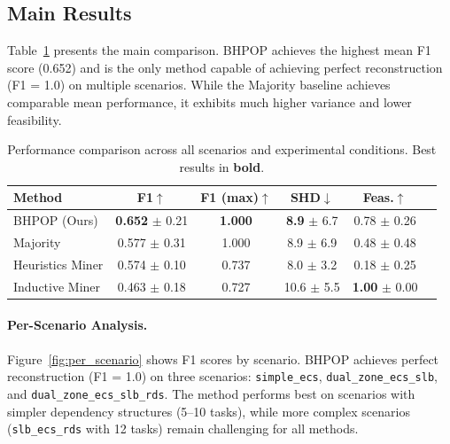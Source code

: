 \subsection{Main Results}

Table~\ref{tab:main_results} presents the main comparison. \textsc{BHPOP} achieves the highest mean F1 score (0.652) and is the only method capable of achieving perfect reconstruction (F1 = 1.0) on multiple scenarios. While the Majority baseline achieves comparable mean performance, it exhibits much higher variance and lower feasibility.

\begin{table}[t]
\caption{Performance comparison across all scenarios and experimental conditions. Best results in \textbf{bold}.}
\label{tab:main_results}
\centering
\small
\begin{tabular}{lccccc}
\toprule
\textbf{Method} & \textbf{F1}$\uparrow$ & \textbf{F1 (max)}$\uparrow$ & \textbf{SHD}$\downarrow$ & \textbf{Feas.}$\uparrow$ \\
\midrule
\textsc{BHPOP} (Ours) & \textbf{0.652} $\pm$ 0.21 & \textbf{1.000} & \textbf{8.9} $\pm$ 6.7 & 0.78 $\pm$ 0.26 \\
Majority & 0.577 $\pm$ 0.31 & 1.000 & 8.9 $\pm$ 6.9 & 0.48 $\pm$ 0.48 \\
Heuristics Miner & 0.574 $\pm$ 0.10 & 0.737 & 8.0 $\pm$ 3.2 & 0.18 $\pm$ 0.25 \\
Inductive Miner & 0.463 $\pm$ 0.18 & 0.727 & 10.6 $\pm$ 5.5 & \textbf{1.00} $\pm$ 0.00 \\
\bottomrule
\end{tabular}
\end{table}

\paragraph{Per-Scenario Analysis.}
Figure~\ref{fig:per_scenario} shows F1 scores by scenario. \textsc{BHPOP} achieves perfect reconstruction (F1 = 1.0) on three scenarios: \texttt{simple\_ecs}, \texttt{dual\_zone\_ecs\_slb}, and \texttt{dual\_zone\_ecs\_slb\_rds}. The method performs best on scenarios with simpler dependency structures (5--10 tasks), while more complex scenarios (\texttt{slb\_ecs\_rds} with 12 tasks) remain challenging for all methods.

